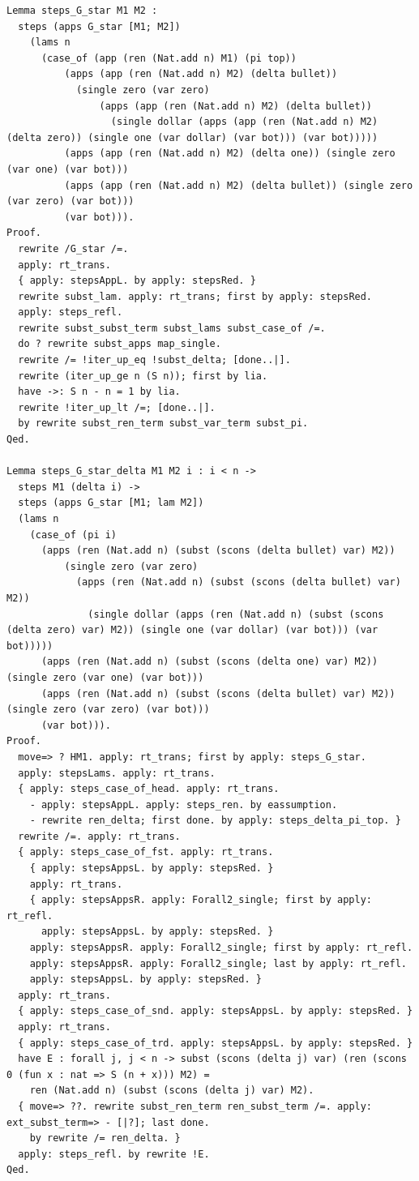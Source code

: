 \begin{lstlisting}
Lemma steps_G_star M1 M2 :
  steps (apps G_star [M1; M2])
    (lams n
      (case_of (app (ren (Nat.add n) M1) (pi top))
          (apps (app (ren (Nat.add n) M2) (delta bullet))
            (single zero (var zero)
                (apps (app (ren (Nat.add n) M2) (delta bullet))
                  (single dollar (apps (app (ren (Nat.add n) M2) (delta zero)) (single one (var dollar) (var bot))) (var bot)))))
          (apps (app (ren (Nat.add n) M2) (delta one)) (single zero (var one) (var bot)))
          (apps (app (ren (Nat.add n) M2) (delta bullet)) (single zero (var zero) (var bot)))
          (var bot))).
Proof.
  rewrite /G_star /=.
  apply: rt_trans.
  { apply: stepsAppL. by apply: stepsRed. }
  rewrite subst_lam. apply: rt_trans; first by apply: stepsRed.
  apply: steps_refl.
  rewrite subst_subst_term subst_lams subst_case_of /=.
  do ? rewrite subst_apps map_single.
  rewrite /= !iter_up_eq !subst_delta; [done..|].
  rewrite (iter_up_ge n (S n)); first by lia.
  have ->: S n - n = 1 by lia.
  rewrite !iter_up_lt /=; [done..|].
  by rewrite subst_ren_term subst_var_term subst_pi.
Qed.

Lemma steps_G_star_delta M1 M2 i : i < n ->
  steps M1 (delta i) ->
  steps (apps G_star [M1; lam M2])
  (lams n
    (case_of (pi i)
      (apps (ren (Nat.add n) (subst (scons (delta bullet) var) M2))
          (single zero (var zero)
            (apps (ren (Nat.add n) (subst (scons (delta bullet) var) M2))
              (single dollar (apps (ren (Nat.add n) (subst (scons (delta zero) var) M2)) (single one (var dollar) (var bot))) (var bot)))))
      (apps (ren (Nat.add n) (subst (scons (delta one) var) M2)) (single zero (var one) (var bot))) 
      (apps (ren (Nat.add n) (subst (scons (delta bullet) var) M2)) (single zero (var zero) (var bot)))
      (var bot))).
Proof.
  move=> ? HM1. apply: rt_trans; first by apply: steps_G_star.
  apply: stepsLams. apply: rt_trans.
  { apply: steps_case_of_head. apply: rt_trans.
    - apply: stepsAppL. apply: steps_ren. by eassumption.
    - rewrite ren_delta; first done. by apply: steps_delta_pi_top. }
  rewrite /=. apply: rt_trans.
  { apply: steps_case_of_fst. apply: rt_trans.
    { apply: stepsAppsL. by apply: stepsRed. }
    apply: rt_trans.
    { apply: stepsAppsR. apply: Forall2_single; first by apply: rt_refl.
      apply: stepsAppsL. by apply: stepsRed. }
    apply: stepsAppsR. apply: Forall2_single; first by apply: rt_refl.
    apply: stepsAppsR. apply: Forall2_single; last by apply: rt_refl.
    apply: stepsAppsL. by apply: stepsRed. }
  apply: rt_trans.
  { apply: steps_case_of_snd. apply: stepsAppsL. by apply: stepsRed. }
  apply: rt_trans.
  { apply: steps_case_of_trd. apply: stepsAppsL. by apply: stepsRed. }
  have E : forall j, j < n -> subst (scons (delta j) var) (ren (scons 0 (fun x : nat => S (n + x))) M2) =
    ren (Nat.add n) (subst (scons (delta j) var) M2).
  { move=> ??. rewrite subst_ren_term ren_subst_term /=. apply: ext_subst_term=> - [|?]; last done.
    by rewrite /= ren_delta. }
  apply: steps_refl. by rewrite !E.
Qed.


\end{lstlisting}
